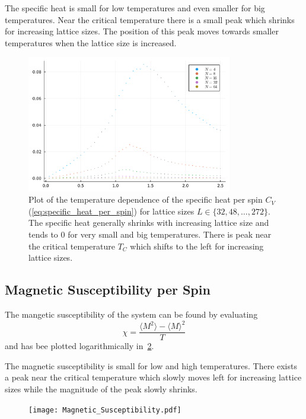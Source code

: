 The specific heat is small for low temperatures and even smaller for big temperatures. Near the critical temperature there is a small peak which shrinks for increasing lattice sizes. The position of this peak moves towards smaller temperatures when the lattice size is increased. 
\begin{figure}[!htb]
	\centering
	\includegraphics[width=0.8\textwidth]{Specific_Heat.pdf}
	\caption[Temperature dependence of the specifc heat per spin $C_V$]{Plot of the temperature dependence of the specific heat per spin $C_V$ (\cref{eq:specific_heat_per_spin}) for lattice sizes $L\in\{32, 48, \dots, 272\}$. The specific heat generally shrinks with increasing lattice size and tends to $0$ for very small and big temperatures. There is peak near the critical temperature $T_C$ which shifts to the left for increasing lattice sizes.}
	\label{fig:specific_heat}
\end{figure}

\subsection{Magnetic Susceptibility per Spin}\label{sec:magnetic_susceptibility_per_spin}
The mangetic susceptibility of the system can be found by evaluating
\begin{equation}\label{eq:magnetic_susceptibility_per_spin}
	\chi = \frac{\langle M^2 \rangle - {\langle M \rangle}^2}{T}
\end{equation}
and has bee plotted logarithmically in~\cref{fig:magnetic_susceptibility}.

The magnetic susceptibility is small for low and high temperatures. There exists a peak near the critical temperature which slowly moves left for increasing lattice sizes while the magnitude of the peak slowly shrinks.
\begin{figure}[!htb]
	\centering
	\texttt{[image: Magnetic\_Susceptibility.pdf]}
	\caption[Temperature dependence of the mangetic susceptibility per spin $\chi$]{}
	\label{fig:magnetic_susceptibility}
\end{figure}

